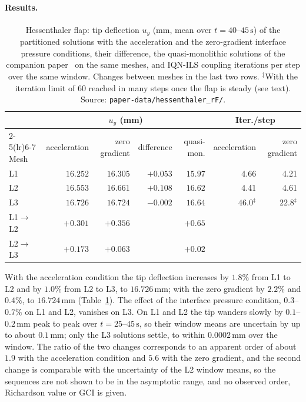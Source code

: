 \paragraph{Results.}
\begin{table}[htbp]
	\centering
	\small
	\setlength{\tabcolsep}{4pt}
	\caption{Hessenthaler flap: tip deflection $u_y$ (mm, mean over $t = 40$--$45\,\mathrm{s}$) of the partitioned solutions with the acceleration and the zero-gradient interface pressure conditions, their difference, the quasi-monolithic solutions of the companion paper~\citep{CardiffBatistic2026QM} on the same meshes, and IQN-ILS coupling iterations per step over the same window. Changes between meshes in the last two rows. ${}^{\ddagger}$With the iteration limit of 60 reached in many steps once the flap is steady (see text). Source: \texttt{paper-data/hessenthaler\_rF/}.}
	\label{tab:hessenthaler_results}
	\begin{tabular}{lrrrrrr}
		\toprule
		 & \multicolumn{4}{c}{$u_y$ (mm)} & \multicolumn{2}{c}{Iter./step} \\
		\cmidrule(lr){2-5}\cmidrule(lr){6-7}
		Mesh & acceleration & zero gradient & difference & quasi-mon. & acceleration & zero gradient \\
		\midrule
		L1 & $16.252$ & $16.305$ & $+0.053$ & $15.97$ & 4.66 & 4.21 \\
		L2 & $16.553$ & $16.661$ & $+0.108$ & $16.62$ & 4.41 & 4.61 \\
		L3 & $16.726$ & $16.724$ & $-0.002$ & $16.64$ & $46.0^{\ddagger}$ & $22.8^{\ddagger}$ \\
		\midrule
		L1$\to$L2 & $+0.301$ & $+0.356$ & & $+0.65$ & & \\
		L2$\to$L3 & $+0.173$ & $+0.063$ & & $+0.02$ & & \\
		\bottomrule
	\end{tabular}
\end{table}
With the acceleration condition the tip deflection increases by $1.8\%$ from L1 to L2 and by $1.0\%$ from L2 to L3, to $16.726\,\mathrm{mm}$; with the zero gradient by $2.2\%$ and $0.4\%$, to $16.724\,\mathrm{mm}$ (Table~\ref{tab:hessenthaler_results}).
The effect of the interface pressure condition, $0.3$--$0.7\%$ on L1 and L2, vanishes on L3.
On L1 and L2 the tip wanders slowly by $0.1$--$0.2\,\mathrm{mm}$ peak to peak over $t = 25$--$45\,\mathrm{s}$, so their window means are uncertain by up to about $0.1\,\mathrm{mm}$; only the L3 solutions settle, to within $0.0002\,\mathrm{mm}$ over the window.
The ratio of the two changes corresponds to an apparent order of about $1.9$ with the acceleration condition and $5.6$ with the zero gradient, and the second change is comparable with the uncertainty of the L2 window means, so the sequences are not shown to be in the asymptotic range, and no observed order, Richardson value or GCI is given.
